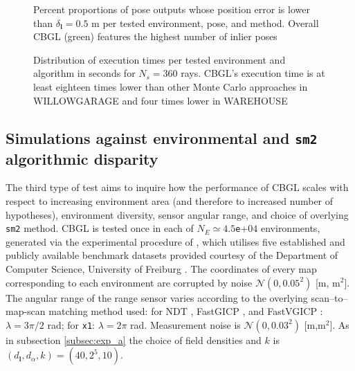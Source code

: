 \begin{figure}
  
  \caption{\small Percent proportions of pose outputs whose position error is
           lower than $\delta_{\bm{l}} = 0.5$ m per tested environment, pose,
           and method. Overall CBGL (green) features the highest number of
           inlier poses}
  \label{fig:b:inliers_per_pose}
\end{figure}

\begin{figure}
  
  \vspace{0.1cm}
  \caption{\small Distribution of execution times per tested environment and
           algorithm in seconds for $N_s = 360$ rays. CBGL's execution time is
           at least eighteen times lower than other Monte Carlo approaches in
           WILLOWGARAGE and four times lower in WAREHOUSE}
  \label{fig:b:execution_times}
  \vspace{-0.5cm}
\end{figure}


\subsection{Simulations against environmental and \texttt{sm2} algorithmic disparity }
\label{subsec:exp_c}

The third type of test aims to inquire how the performance of CBGL scales with
respect to increasing environment area (and therefore to increased number of
hypotheses), environment diversity, sensor angular range, and choice of
overlying \texttt{sm2} method. CBGL is tested once in each of
$N_E \simeq 4.5$\texttt{e}+$04$ environments, generated via the experimental
procedure of \cite{Filotheou2023a}, which utilises five established and
publicly available benchmark datasets provided courtesy of the Department of
Computer Science, University of Freiburg \cite{datasets_link}.  The coordinates
of every map corresponding to each environment are corrupted by noise
$\mathcal{N}(0,0.05^2)$ [m, m$^2$]. The angular range of the range sensor
varies according to the overlying scan--to--map-scan matching method used: for
NDT \cite{ndt}, FastGICP \cite{fgi}, and FastVGICP \cite{fvg}: $\lambda =
3\pi/2$ rad; for \texttt{x1}: $\lambda = 2\pi$ rad. Measurement noise is
$\mathcal{N}(0,0.03^2)$ [m,m$^2$]. As in subsection \ref{subsec:exp_a} the
choice of field densities and $k$ is $(d_{\bm{l}},d_{\alpha},k) = (40, 2^5,
10)$.

